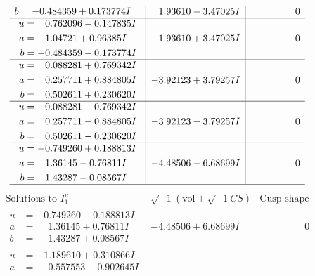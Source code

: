 \documentclass[1p]{elsarticle_modified}
\theoremstyle{definition}
\newcommand{\I}{\sqrt{-1}}
\begin{document}
$$\begin{array}{c|c|c}
\begin{aligned}
b &= -0.484359 + 0.173774 I\end{aligned}
 & \phantom{-}1.93610 - 3.47025 I & \phantom{-0.000000 } 0 \\ \hline\begin{aligned}
u &= \phantom{-}0.762096 - 0.147835 I \\
a &= \phantom{-}1.04721 + 0.96385 I \\
b &= -0.484359 - 0.173774 I\end{aligned}
 & \phantom{-}1.93610 + 3.47025 I & \phantom{-0.000000 } 0 \\ \hline\begin{aligned}
u &= \phantom{-}0.088281 + 0.769342 I \\
a &= \phantom{-}0.257711 + 0.884805 I \\
b &= \phantom{-}0.502611 + 0.230620 I\end{aligned}
 & -3.92123 + 3.79257 I & \phantom{-0.000000 } 0 \\ \hline\begin{aligned}
u &= \phantom{-}0.088281 - 0.769342 I \\
a &= \phantom{-}0.257711 - 0.884805 I \\
b &= \phantom{-}0.502611 - 0.230620 I\end{aligned}
 & -3.92123 - 3.79257 I & \phantom{-0.000000 } 0 \\ \hline\begin{aligned}
u &= -0.749260 + 0.188813 I \\
a &= \phantom{-}1.36145 - 0.76811 I \\
b &= \phantom{-}1.43287 - 0.08567 I\end{aligned}
 & -4.48506 - 6.68699 I & \phantom{-0.000000 } 0\\
 \hline 
 \end{array}$$\newpage$$\begin{array}{c|c|c}  
\text{Solutions to }I^u_{1}& \I (\text{vol} + \sqrt{-1}CS) & \text{Cusp shape}\\
 \hline 
\begin{aligned}
u &= -0.749260 - 0.188813 I \\
a &= \phantom{-}1.36145 + 0.76811 I \\
b &= \phantom{-}1.43287 + 0.08567 I\end{aligned}
 & -4.48506 + 6.68699 I & \phantom{-0.000000 } 0 \\ \hline\begin{aligned}
u &= -1.189610 + 0.310866 I \\
a &= \phantom{-}0.557553 - 0.902645 I \\

\end{aligned}
\end{array}$$
\end{document}
